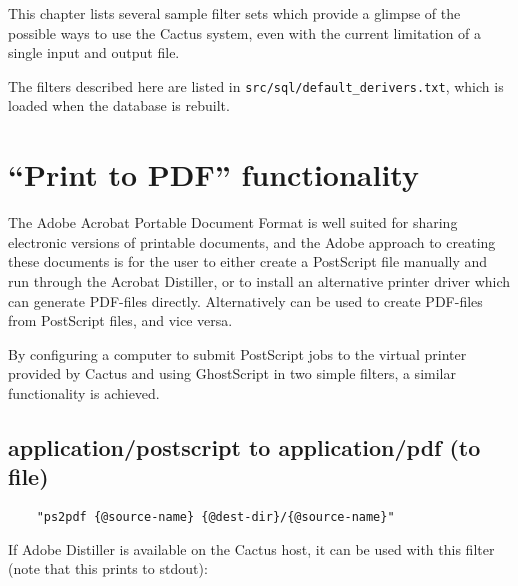 This chapter lists several sample filter sets which provide a glimpse
of the possible ways to use the Cactus system, even with the current
limitation of a single input and output file.

The filters described here are listed in 
\texttt{src/sql/default_derivers.txt}, which is loaded when the
database is rebuilt.


\section{``Print to PDF'' functionality}
\label{sec:network-adobe-acrobat-pdf-printer}





The Adobe Acrobat Portable Document Format is well suited for sharing
electronic versions of printable documents, and the Adobe approach to
creating these documents is for the user to either create a PostScript
file manually and run through the Acrobat Distiller, or to install an
alternative printer driver which can generate PDF-files directly.
Alternatively  can be used to create PDF-files from PostScript files, and
vice versa.

By configuring a computer to submit PostScript jobs to the virtual
printer provided by Cactus and using GhostScript in two simple filters,
a similar functionality is achieved.

\subsection*{application/postscript to application/pdf (to file)}

\begin{verbatim}
    "ps2pdf {@source-name} {@dest-dir}/{@source-name}"
\end{verbatim}

If Adobe Distiller is available on the Cactus host, it can be used
with this filter (note that this prints to stdout):

